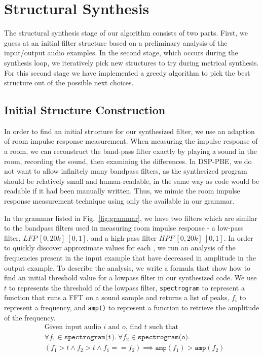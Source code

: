 \section{Structural Synthesis}
\label{sec:struct}

The structural synthesis stage of our algorithm consists of two parts.
First, we guess at an initial filter structure based on a preliminary analysis of the input/output audio examples.
In the second stage, which occurs during the synthesis loop, we iteratively pick new structures to try during metrical synthesis.
For this second stage we have implemented a greedy algorithm to pick the best structure out of the possible next choices.

\subsection{Initial Structure Construction}
\label{sec:initStruct}
In order to find an initial structure for our synthesized filter, we use an adaption of room impulse response measurement.
When measuring the impulse response of a room, we can reconstruct the band-pass filter exactly by playing a sound in the room, recording the sound, then examining the differences.
In DSP-PBE, we do not want to allow infinitely many bandpass filters, as the synthesized program should be relatively small and human-readable, in the same way as code would be readable if it had been manually written.
Thus, we mimic the room impulse response measurement technique using only the available \dspnode in our grammar.

In the grammar listed in Fig.~\ref{fig:grammar}, we have two filters which are similar to the bandpass filters used in measuring room impulse response - a low-pass filter, $LFP \ [0,20k]\ [0,1]$, and a high-pass filter $HPF\ [0,20k]\ [0,1]$.
In order to quickly discover approximate values for each \dspnode, we run an analysis of the frequencies present in the input example that have decreased in amplitude in the output example.
To describe the analysis, we write a formula that show how to find an initial threshold value for a lowpass filter in our synthesized code.
We use $t$ to represents the threshold of the lowpass filter, \texttt{spectrogram} to represent a function that runs a FFT on a sound sample and returns a list of peaks, $f_i$ to represent a frequency, and \texttt{amp()} to represent a function to retrieve the amplitude of the frequency. 
%
\begin{align*}
&\text{Given input audio }i\text{ and }o\text{, find }t\text{ such that} \\
&\forall f_1 \in  \texttt{spectrogram(i)}.\ \forall f_2 \in \texttt{spectrogram(o)}. \\
&(f_1 > t \land  f_2 > t \land f_1 == f_2) \implies \texttt{amp}(f_1) > \texttt{amp}(f_2)
\end{align*}


